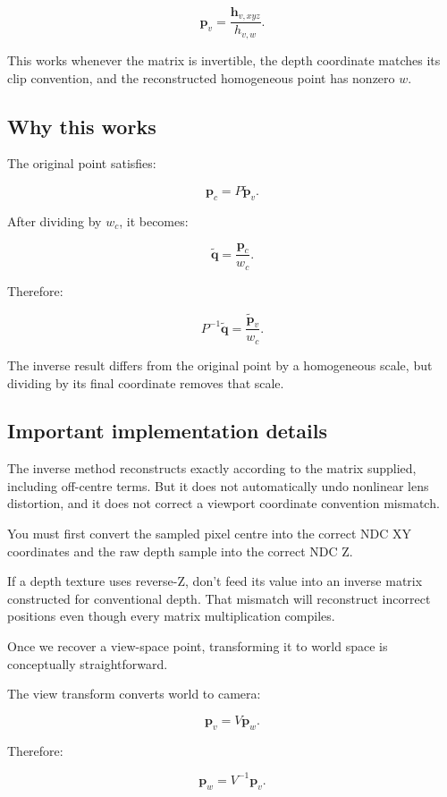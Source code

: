 \[ \boxed{ \mathbf p_v=\frac{\mathbf h_{v,xyz}}{h_{v,w}}. } \]

This works whenever the matrix is invertible, the depth coordinate matches its clip convention, and the reconstructed homogeneous point has nonzero \(w\).

\subsection{Why this works}\label{02-foundations-ii-ch035-why-this-works}

The original point satisfies:

\[ \mathbf p_c=P\tilde{\mathbf p}_v. \]

After dividing by \(w_c\), it becomes:

\[ \tilde{\mathbf q} = \frac{\mathbf p_c}{w_c}. \]

Therefore:

\[ P^{-1}\tilde{\mathbf q} = \frac{\tilde{\mathbf p}_v}{w_c}. \]

The inverse result differs from the original point by a homogeneous scale, but dividing by its final coordinate removes that scale.

\subsection{Important implementation details}\label{02-foundations-ii-ch035-important-implementation-details}

The inverse method reconstructs exactly according to the matrix supplied, including off-centre terms. But it does not automatically undo nonlinear lens distortion, and it does not correct a viewport coordinate convention mismatch.

You must first convert the sampled pixel centre into the correct NDC XY coordinates and the raw depth sample into the correct NDC Z.

If a depth texture uses reverse-Z, don't feed its value into an inverse matrix constructed for conventional depth. That mismatch will reconstruct incorrect positions even though every matrix multiplication compiles.

Once we recover a view-space point, transforming it to world space is conceptually straightforward.

The view transform converts world to camera:

\[ \mathbf p_v=V\mathbf p_w. \]

Therefore:

\[ \boxed{ \mathbf p_w=V^{-1}\mathbf p_v. } \]

